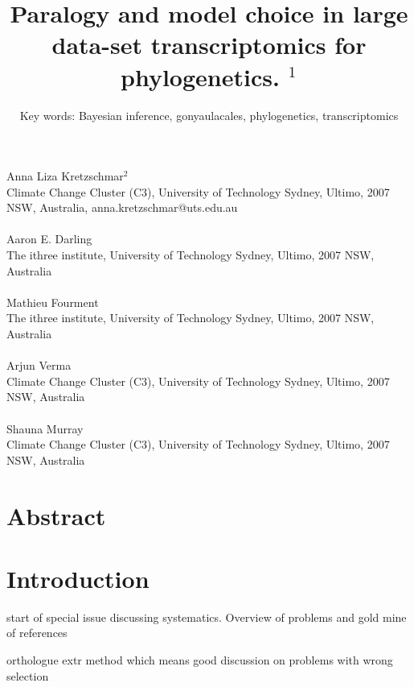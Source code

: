 \documentclass[12pt]{article}
\title{Paralogy and model choice in large data-set transcriptomics for phylogenetics. $^{1}$}
\author{Key words: Bayesian inference, gonyaulacales, phylogenetics, transcriptomics}
\date{}
\begin{document}
\maketitle
\paragraph{}Anna Liza Kretzschmar$^{2}$\\
Climate Change Cluster (C3), University of Technology Sydney, Ultimo, 2007 NSW, Australia, anna.kretzschmar@uts.edu.au
\paragraph{}Aaron E. Darling \\
The ithree institute, University of Technology Sydney, Ultimo, 2007 NSW, Australia
\paragraph{}Mathieu Fourment \\
The ithree institute, University of Technology Sydney, Ultimo, 2007 NSW, Australia
\paragraph{}Arjun Verma\\
Climate Change Cluster (C3), University of Technology Sydney, Ultimo, 2007 NSW, Australia
\paragraph{}Shauna Murray\\ 
Climate Change Cluster (C3), University of Technology Sydney, Ultimo, 2007 NSW, Australia
\newpage
\section{Abstract}
\newpage

\section{Introduction}

\cite{posada2016phylogenomics} start of special issue discussing systematics. Overview of problems and gold mine of references


\cite{yang2014orthology} orthologue extr method which means good discussion on problems with wrong selection
\end{document}

